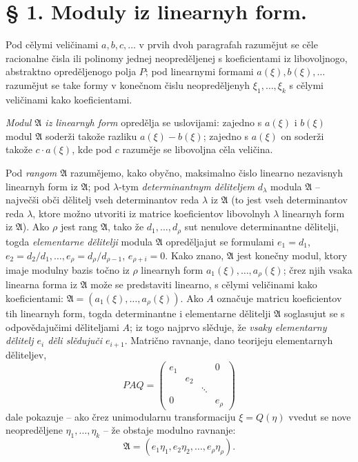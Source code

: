 \documentclass[11pt]{article}
\providecommand{\Amod}{\mathfrak A}
\begin{document}
\section*{§ 1. Moduly iz linearnyh form.}

Pod cělymi veličinami $a,b,c,\ldots$ v prvih dvoh paragrafah razumějut se cěle racionalne čisla ili polinomy jednej neopreděljenej s koeficientami iz libovoljnogo, abstraktno opreděljenogo polja $P$; pod linearnymi formami $a(\xi),b(\xi),\ldots$ razumějut se take formy v konečnom čislu neopreděljenyh $\xi_1,\ldots,\xi_k$ s cělymi veličinami kako koeficientami.

\emph{Modul $\Amod$ iz linearnyh form} opredělja se uslovijami: zajedno s $a(\xi)$ i $b(\xi)$ modul $\Amod$ soderži takože razliku $a(\xi)-b(\xi)$; zajedno s $a(\xi)$ on soderži takože $c\cdot a(\xi)$, kde pod $c$ razuměje se libovoljna cěla veličina.

Pod \emph{rangom $\Amod$} razumějemo, kako obyčno, maksimalno čislo linearno nezavisnyh linearnyh form iz $\Amod$; pod $\lambda$-tym \emph{determinantnym děliteljem} $d_\lambda$ modula $\Amod$ -- največši obči dělitelj vseh determinantov reda $\lambda$ iz $\Amod$ (to jest vseh determinantov reda $\lambda$, ktore možno utvoriti iz matrice koeficientov libovolnyh $\lambda$ linearnyh form iz $\Amod$). Ako $\rho$ jest rang $\Amod$, tako že $d_1,\ldots,d_\rho$ sut nenulove determinantne dělitelji, togda \emph{elementarne dělitelji} modula $\Amod$ opreděljajut se formulami $e_1=d_1$, $e_2=d_2/d_1,\ldots,e_\rho=d_\rho/d_{\rho-1}$, $e_{\rho+i}=0$. Kako znano, $\Amod$ jest konečny modul, ktory imaje modulny bazis točno iz $\rho$ linearnyh form $a_1(\xi),\ldots,a_\rho(\xi)$; črez njih vsaka linearna forma iz $\Amod$ može se predstaviti linearno, s cělymi veličinami kako koeficientami:
$\Amod=(a_1(\xi),\ldots,a_\rho(\xi))$. Ako $A$ označuje matricu koeficientov tih linearnyh form, togda determinantne i elementarne dělitelji $\Amod$ soglasujut se s odpovědajučimi děliteljami $A$; iz togo najprvo slěduje, že \emph{vsaky elementarny dělitelj $e_i$ děli slědujuči $e_{i+1}$}. Matrično ravnanje, dano teorijeju elementarnyh děliteljev,
\[
 P A Q=\begin{pmatrix}
 e_1&&&0\\
 &e_2&&\\
 &&\ddots&\\
 0&&&e_\rho
 \end{pmatrix}
\]
dale pokazuje -- ako črez unimodularnu transformaciju $\xi=Q(\eta)$ vvedut se nove neopreděljene $\eta_1,\ldots,\eta_k$ -- že obstaje modulno ravnanje:
\begin{equation}
 \Amod=(e_1\eta_1,e_2\eta_2,\ldots,e_\rho\eta_\rho).
\tag{1}
\end{equation}
\end{document}
